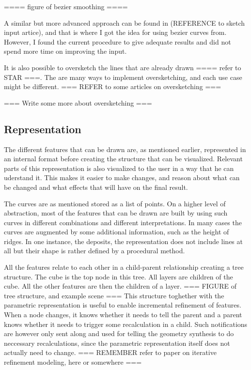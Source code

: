 \documentclass[a4paper,10pt]{article}
\begin{document}
==== figure of bezier smoothing ====

A similar but more advanced approach can be found in (REFERENCE to sketch input artice), and that is where I got the idea for using bezier curves from. However, I found the current procedure to give adequate results and did not spend more time on improving the input.


It is also possible to oversketch the lines that are already drawn ==== refer to STAR ===. The are many ways to implement oversketching, and each use case might be different. === REFER to some articles on oversketching ===

=== Write some more about oversketching ===


\subsection{Representation}
The different features that can be drawn are, as mentioned earlier, represented in an internal format before creating the structure that can be visualized. Relevant parts of this representation is also visualized to the user in a way that he can uderstand it. This makes it easier to make changes, and reason about what can be changed and what effects that will have on the final result.

The curves are as mentioned stored as a list of points. On a higher level of abstraction, most of the features that can be drawn are built by using such curves in different combinations and different interpretations. In many cases the curves are augmented by some additional information, such as the height of ridges. In one instance, the deposits, the representation does not include lines at all but their shape is rather defined by a procedural method.

All the features relate to each other in a child-parent relationship creating a tree structure. The cube is the top node in this tree. All layers are children of the cube. All the other features are then the children of a layer. === FIGURE of tree structure, and example scene === This structure toghether with the parametric representation is useful to enable incremental refinement of features. When a node changes, it knows whether it needs to tell the parent and a parent knows whether it needs to trigger some recalculation in a child. Such notifications are however only sent along and used for telling the geometry synthesis to do neccessary recalculations, since the parametric representation itself does not actually need to change. === REMEMBER refer to paper on iterative refinement modeling, here or somewhere ===
\end{document}
